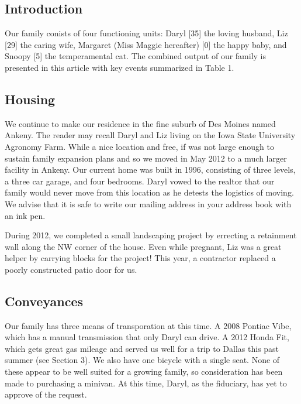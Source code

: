 \documentclass{article}
\begin{document}
\begin{multicols}{2}

\section{Introduction}
Our family conists of four functioning units:  Daryl [35] the loving
husband, Liz [29] the caring wife, Margaret (Miss Maggie hereafter) [0] 
the happy baby, and Snoopy [5] the temperamental cat.  The combined output
of our family is presented in this article with key events summarized in
Table 1.

\subsection{Housing}

We continue to make our residence in the fine suburb of Des Moines 
named Ankeny.  The reader may recall Daryl and Liz living on the
Iowa State University Agronomy Farm.  While a nice location and free,
if was not large enough to sustain family expansion plans and so we moved 
in May 2012 to a much larger facility in Ankeny.  Our current home 
was built in 1996, consisting of three levels, a three car garage, and
four bedrooms.  Daryl vowed to the realtor that our family would never
move from this location as he detests the logistics of moving.  We advise that it is safe to write our mailing
address in your address book with an ink pen.

During 2012, we completed a small landscaping project by errecting a 
retainment wall along the NW corner of the house.  Even while pregnant,
Liz was a great helper by carrying blocks for the project!  This year, 
a contractor replaced a poorly constructed patio door for us.

\subsection{Conveyances}

Our family has three means of transporation at this time.  A 2008 Pontiac 
Vibe, which has a manual transmission that only Daryl can drive.  A 2012 
Honda Fit, which gets great gas mileage and served us well for a trip to
Dallas this past summer (see Section 3).  We also have one bicycle with a single seat.
None of these appear to be well suited for a growing family, so consideration
has been made to purchasing a minivan.  At this time, Daryl, as the fiduciary,
has yet to approve of the request.


\end{multicols}
\end{document}

